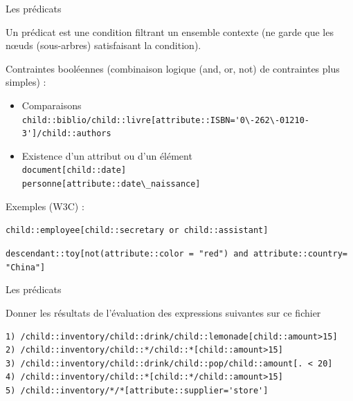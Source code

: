 \begin{frame}{Les prédicats}

Un prédicat est une condition filtrant un ensemble contexte (ne garde que les n{\oe}uds (sous-arbres) satisfaisant la condition).\\

\medskip


Contraintes booléennes (combinaison logique (and, or, not) de contraintes plus simples) :
\begin{itemize}
\item Comparaisons \\
	\verb?child::biblio/child::livre[attribute::ISBN='0\-262\-01210-3']/child::authors?
\item Existence d'un attribut ou d'un élément \\
	\verb?document[child::date]?\\
	\verb?personne[attribute::date\_naissance]?
\end{itemize}


\bigskip

Exemples (W3C) :\\

\smallskip

\verb?child::employee[child::secretary or child::assistant]?\\

\smallskip

\verb?descendant::toy[not(attribute::color = "red") and attribute::country= "China"]?

\end{frame}


\begin{frame}{Les prédicats}

\vspace{-0.5cm}
     \begin{minipage}{0.7\textwidth}
        
      \end{minipage}

\vspace{-0.5cm}
\begin{exoblock}{Donner les résultats de l'évaluation des expressions suivantes sur ce fichier}
     \begin{footnotesize}
\begin{verbatim}
1) /child::inventory/child::drink/child::lemonade[child::amount>15]
2) /child::inventory/child::*/child::*[child::amount>15]
3) /child::inventory/child::drink/child::pop/child::amount[. < 20]
4) /child::inventory/child::*[child::*/child::amount>15]
5) /child::inventory/*/*[attribute::supplier='store']
\end{verbatim}
     \end{footnotesize}
      \end{exoblock}
\end{frame}

